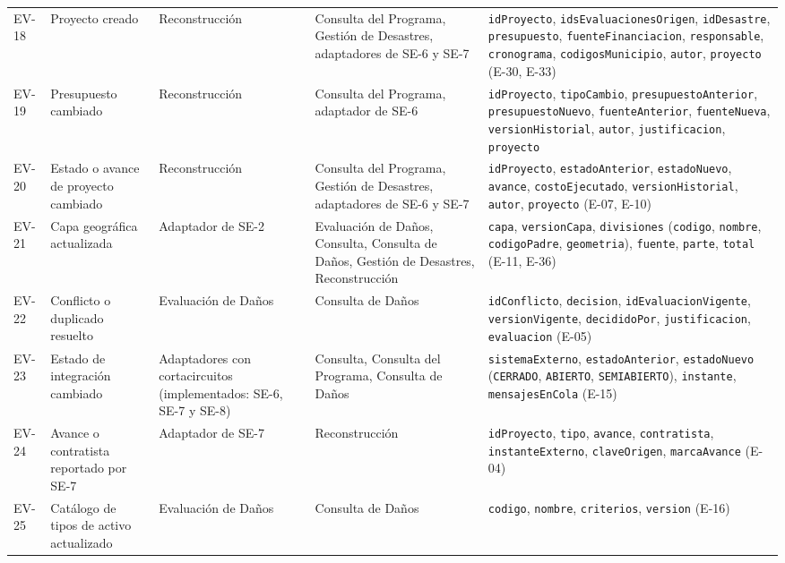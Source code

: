 \documentclass[11pt,letterpaper]{article}
\begin{document}
\begin{longtable}{L{1.1cm} L{2.7cm} L{2.4cm} L{2.9cm} L{6.2cm}}
EV-18 & Proyecto creado & Reconstrucción & Consulta del Programa, Gestión de Desastres, adaptadores
de SE-6 y SE-7 & \texttt{idProyecto}, \texttt{idsEvaluacionesOrigen}, \texttt{idDesastre},
\texttt{presupuesto}, \texttt{fuenteFinanciacion}, \texttt{responsable}, \texttt{cronograma},
\texttt{codigosMunicipio}, \texttt{autor}, \texttt{proyecto} (E-30, E-33) \\
EV-19 & Presupuesto cambiado & Reconstrucción & Consulta del Programa, adaptador de SE-6 &
\texttt{idProyecto}, \texttt{tipoCambio}, \texttt{presupuestoAnterior}, \texttt{presupuestoNuevo},
\texttt{fuenteAnterior}, \texttt{fuenteNueva}, \texttt{versionHistorial}, \texttt{autor},
\texttt{justificacion}, \texttt{proyecto} \\
EV-20 & Estado o avance de proyecto cambiado & Reconstrucción & Consulta del Programa, Gestión de
Desastres, adaptadores de SE-6 y SE-7 & \texttt{idProyecto}, \texttt{estadoAnterior},
\texttt{estadoNuevo}, \texttt{avance}, \texttt{costoEjecutado}, \texttt{versionHistorial},
\texttt{autor}, \texttt{proyecto} (E-07, E-10) \\
EV-21 & Capa geográfica actualizada & Adaptador de SE-2 & Evaluación de Daños, Consulta, Consulta de
Daños, Gestión de Desastres, Reconstrucción & \texttt{capa}, \texttt{versionCapa},
\texttt{divisiones} (\texttt{codigo}, \texttt{nombre}, \texttt{codigoPadre}, \texttt{geometria}),
\texttt{fuente}, \texttt{parte}, \texttt{total} (E-11, E-36) \\
EV-22 & Conflicto o duplicado resuelto & Evaluación de Daños & Consulta de Daños &
\texttt{idConflicto}, \texttt{decision}, \texttt{idEvaluacionVigente}, \texttt{versionVigente},
\texttt{decididoPor}, \texttt{justificacion}, \texttt{evaluacion} (E-05) \\
EV-23 & Estado de integración cambiado & Adaptadores con cortacircuitos (implementados: SE-6, SE-7 y SE-8) & Consulta, Consulta
del Programa, Consulta de Daños & \texttt{sistemaExterno}, \texttt{estadoAnterior},
\texttt{estadoNuevo} (\texttt{CERRADO}, \texttt{ABIERTO}, \texttt{SEMIABIERTO}), \texttt{instante},
\texttt{mensajesEnCola} (E-15) \\
EV-24 & Avance o contratista reportado por SE-7 & Adaptador de SE-7 & Reconstrucción &
\texttt{idProyecto}, \texttt{tipo}, \texttt{avance}, \texttt{contratista},
\texttt{instanteExterno}, \texttt{claveOrigen}, \texttt{marcaAvance} (E-04) \\
EV-25 & Catálogo de tipos de activo actualizado & Evaluación de Daños & Consulta de Daños &
\texttt{codigo}, \texttt{nombre}, \texttt{criterios}, \texttt{version} (E-16) \\

\end{longtable}
\end{document}
